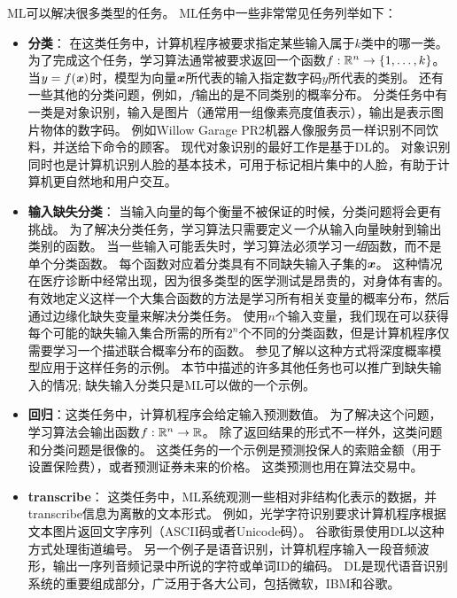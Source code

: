 \gls{ML}可以解决很多类型的任务。
\gls{ML}任务中一些非常常见任务列举如下：
\begin{itemize}
    \item \textbf{分类}：
    在这类任务中，计算机程序被要求指定某些输入属于$k$类中的哪一类。
    为了完成这个任务，学习算法通常被要求返回一个函数$f:\mathbb{R}^n \to \{1,\dots,k\}$。
    当$y=f(\boldsymbol{\mathit{x}})$时，模型为向量$\boldsymbol{\mathit{x}}$所代表的输入指定数字码$y$所代表的类别。
    还有一些其他的分类问题，例如，$f$输出的是不同类别的概率分布。
    分类任务中有一类是对象识别，输入是图片（通常用一组像素亮度值表示），输出是表示图片物体的数字码。
    例如Willow Garage PR2机器人像服务员一样识别不同饮料，并送给下命令的顾客\citep{Goodfellow2010}。
    现代对象识别的最好工作是基于\gls{DL}的\citep{Krizhevsky-2012-small,Ioffe+Szegedy-2015}。
    对象识别同时也是计算机识别人脸的基本技术，可用于标记相片集中的人脸\citep{Taigman-et-al-CVPR2014}，有助于计算机更自然地和用户交互。
    
    \item \textbf{输入缺失分类}：
    当输入向量的每个衡量不被保证的时候，分类问题将会更有挑战。
    为了解决分类任务，学习算法只需要定义\emph{一个}从输入向量映射到输出类别的函数。
    当一些输入可能丢失时，学习算法必须学习\emph{一组}函数，而不是单个分类函数。
    每个函数对应着分类具有不同缺失输入子集的$\boldsymbol{\mathit{x}}$。
    这种情况在医疗诊断中经常出现，因为很多类型的医学测试是昂贵的，对身体有害的。
    有效地定义这样一个大集合函数的方法是学习所有相关变量的概率分布，然后通过边缘化缺失变量来解决分类任务。 
    使用$n$个输入变量，我们现在可以获得每个可能的缺失输入集合所需的所有$2^n$个不同的分类函数，但是计算机程序仅需要学习一个描述联合概率分布的函数。
    参见\cite{Goodfellow-et-al-NIPS2013}了解以这种方式将深度概率模型应用于这样任务的示例。 
    本节中描述的许多其他任务也可以推广到缺失输入的情况; 缺失输入分类只是\gls{ML}可以做的一个示例。
    

    \item \textbf{回归}：这类任务中，计算机程序会给定输入预测数值。
    为了解决这个问题，学习算法会输出函数$f:\mathbb{R}^n \to \mathbb{R}$。
    除了返回结果的形式不一样外，这类问题和分类问题是很像的。
    这类任务的一个示例是预测投保人的索赔金额（用于设置保险费），或者预测证券未来的价格。
    这类预测也用在算法交易中。
    
    \item \textbf{\gls{transcribe}}：
    这类任务中，\gls{ML}系统观测一些相对非结构化表示的数据，并\gls{transcribe}信息为离散的文本形式。
    例如，光学字符识别要求计算机程序根据文本图片返回文字序列（ASCII码或者Unicode码）。
    谷歌街景使用\gls{DL}以这种方式处理街道编号\citep{Goodfellow+et+al-ICLR2014a}。
    另一个例子是语音识别，计算机程序输入一段音频波形，输出一序列音频记录中所说的字符或单词ID的编码。
    \gls{DL}是现代语音识别系统的重要组成部分，广泛用于各大公司，包括微软，IBM和谷歌\citep{Hinton-et-al-2012}。


\end{itemize}
